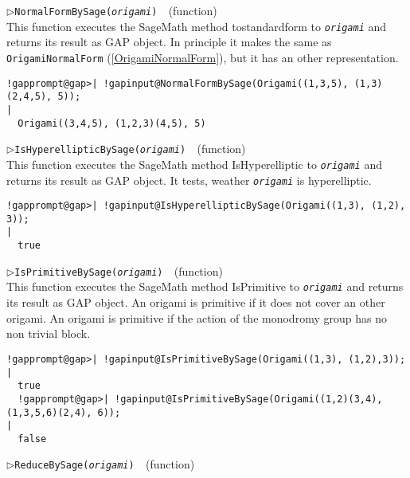 \documentclass[a4paper,11pt]{report}
\begin{document}
{{{\begin{Verbatim}[commandchars=!@|,fontsize=\small,frame=single,label=Example]
\end{Verbatim}
 \noindent\textcolor{FuncColor}{$\triangleright$\enspace\texttt{NormalFormBySage({\mdseries\slshape origami})
\label{NormalFormBySage}
}\hfill{\scriptsize (function)}}\\


 This function executes the SageMath method
to{\textunderscore}standard{\textunderscore}form to \mbox{\texttt{\mdseries\slshape origami}} and returns its result as \textsf{GAP} object. In principle it makes the same as \texttt{OrigamiNormalForm} (\ref{OrigamiNormalForm}), but it has an other representation. 
\begin{Verbatim}[commandchars=!@|,fontsize=\small,frame=single,label=Example]
  !gapprompt@gap>| !gapinput@NormalFormBySage(Origami((1,3,5), (1,3)(2,4,5), 5));
|
  Origami((3,4,5), (1,2,3)(4,5), 5)
\end{Verbatim}
 \noindent\textcolor{FuncColor}{$\triangleright$\enspace\texttt{IsHyperellipticBySage({\mdseries\slshape origami})
\label{IsHyperellipticBySage}
}\hfill{\scriptsize (function)}}\\


 This function executes the SageMath method IsHyperelliptic to \mbox{\texttt{\mdseries\slshape origami}} and returns its result as \textsf{GAP} object. It tests, weather \mbox{\texttt{\mdseries\slshape origami}} is hyperelliptic. 
\begin{Verbatim}[commandchars=!@|,fontsize=\small,frame=single,label=Example]
  !gapprompt@gap>| !gapinput@IsHyperellipticBySage(Origami((1,3), (1,2), 3));                                                                                           
|
  true
\end{Verbatim}
 \noindent\textcolor{FuncColor}{$\triangleright$\enspace\texttt{IsPrimitiveBySage({\mdseries\slshape origami})
\label{IsPrimitiveBySage}
}\hfill{\scriptsize (function)}}\\


 This function executes the SageMath method IsPrimitive to \mbox{\texttt{\mdseries\slshape origami}} and returns its result as \textsf{GAP} object. An origami is primitive if it does not cover an other origami. An
origami is primitive if the action of the monodromy group has no non trivial
block. 
\begin{Verbatim}[commandchars=!@|,fontsize=\small,frame=single,label=Example]
  !gapprompt@gap>| !gapinput@IsPrimitiveBySage(Origami((1,3), (1,2),3));
|
  true
  !gapprompt@gap>| !gapinput@IsPrimitiveBySage(Origami((1,2)(3,4), (1,3,5,6)(2,4), 6));
|
  false
\end{Verbatim}
 \noindent\textcolor{FuncColor}{$\triangleright$\enspace\texttt{ReduceBySage({\mdseries\slshape origami})
\label{ReduceBySage}
}\hfill{\scriptsize (function)}}\\


}}}
\end{document}
